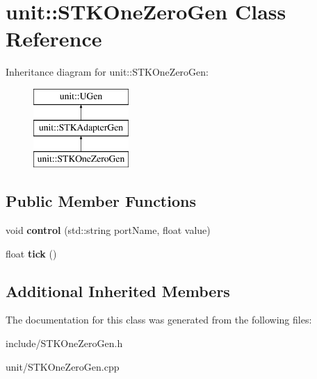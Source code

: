 \hypertarget{classunit_1_1STKOneZeroGen}{}\section{unit\+:\+:S\+T\+K\+One\+Zero\+Gen Class Reference}
\label{classunit_1_1STKOneZeroGen}
Inheritance diagram for unit\+:\+:S\+T\+K\+One\+Zero\+Gen\+:\begin{figure}[H]
\begin{center}
\leavevmode
\includegraphics[height=3.000000cm]{classunit_1_1STKOneZeroGen}
\end{center}
\end{figure}
\subsection*{Public Member Functions}
\begin{DoxyCompactItemize}
\item 
void {\bfseries control} (std\+::string port\+Name, float value)\hypertarget{classunit_1_1STKOneZeroGen_a44bc26cf6f0e7218f9f14447c957dce4}{}\label{classunit_1_1STKOneZeroGen_a44bc26cf6f0e7218f9f14447c957dce4}

\item 
float {\bfseries tick} ()\hypertarget{classunit_1_1STKOneZeroGen_ab1118ea13c6892f49c8f92f017b82908}{}\label{classunit_1_1STKOneZeroGen_ab1118ea13c6892f49c8f92f017b82908}

\end{DoxyCompactItemize}
\subsection*{Additional Inherited Members}


The documentation for this class was generated from the following files\+:\begin{DoxyCompactItemize}
\item 
include/S\+T\+K\+One\+Zero\+Gen.\+h\item 
unit/S\+T\+K\+One\+Zero\+Gen.\+cpp\end{DoxyCompactItemize}
